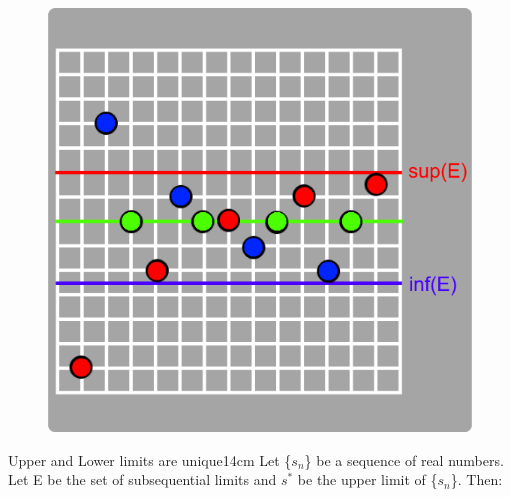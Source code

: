 	\begin{figure}[h]
		\centering
		\includegraphics[scale=0.3]{Images/9.1.2.png}
	\end{figure}



	\begin{wtheorem}{Upper and Lower limits are unique}{14cm}
		Let \{$s_n$\} be a sequence of real numbers.
		Let E be the set of subsequential limits and
		$s^*$ be the upper limit of \{$s_n$\}. Then:
	\end{wtheorem}

